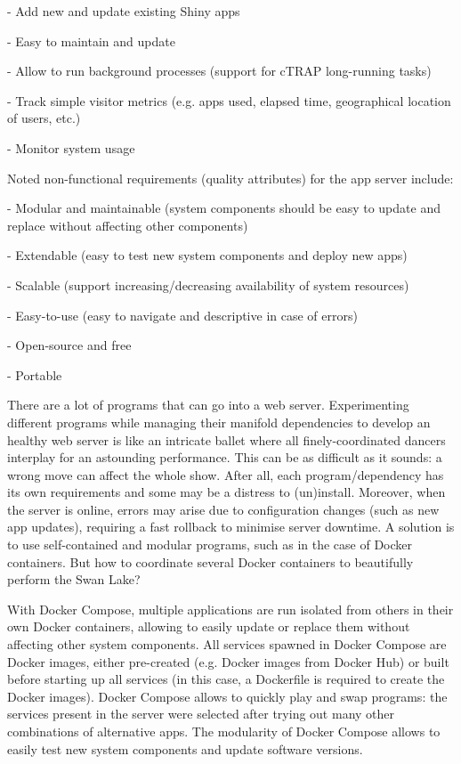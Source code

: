 - Add new and update existing Shiny apps

- Easy to maintain and update

- Allow to run background processes (support for cTRAP long-running tasks)

- Track simple visitor metrics (e.g. apps used, elapsed time, geographical location of users, etc.)

- Monitor system usage

Noted non-functional requirements (quality attributes) for the app server include:

- Modular and maintainable (system components should be easy to update and replace without affecting other components)

- Extendable (easy to test new system components and deploy new apps)

- Scalable (support increasing/decreasing availability of system resources)

- Easy-to-use (easy to navigate and descriptive in case of errors)

- Open-source and free

- Portable

There are a lot of programs that can go into a web server. Experimenting different programs while managing their manifold dependencies to develop an healthy web server is like an intricate ballet where all finely-coordinated dancers interplay for an astounding performance. This can be as difficult as it sounds: a wrong move can affect the whole show. After all, each program/dependency has its own requirements and some may be a distress to (un)install. Moreover, when the server is online, errors may arise due to configuration changes (such as new app updates), requiring a fast rollback to minimise server downtime. A solution is to use self-contained and modular programs, such as in the case of Docker containers. But how to coordinate several Docker containers to beautifully perform the Swan Lake?

With Docker Compose, multiple applications are run isolated from others in their own Docker containers, allowing to easily update or replace them without affecting other system components. All services spawned in Docker Compose are Docker images, either pre-created (e.g.  Docker images from Docker Hub) or built before starting up all services (in this case, a Dockerfile is required to create the Docker images). Docker Compose allows to quickly play and swap programs: the services present in the server were selected after trying out many other combinations of alternative apps. The modularity of Docker Compose allows to easily test new system components and update software versions.

